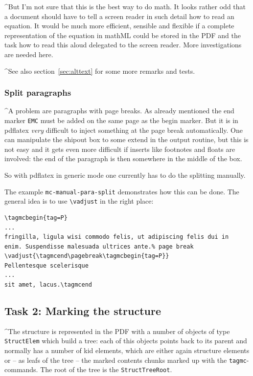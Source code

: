 \documentclass[DIV=12,parskip=half-,bibliography=totoc]{scrartcl}
\newcommand\PDF{PDF}
\begin{document}
\TagP^But I'm not sure that this is the best way to do math. It looks rather odd that a document should have to tell a screen reader in such detail how to read an equation. It would be much more efficient, sensible and flexible if a complete representation of the equation in mathML could be stored in the \PDF{} and the task how to read this aloud delegated to the screen reader. More investigations are needed here.\TagPend

\TagP^See also section~\ref{sec:alttext} for some more remarks and tests.\TagPend

\subsubsection{Split paragraphs}\label{sec:splitpara}

\TagP^A problem are paragraphs with page breaks.  As already mentioned the end marker \texttt{EMC} must be added on the same page as the begin marker. But it is in pdflatex \emph{very} difficult to inject something at the page break automatically. One can manipulate the shipout box to some extend in the output routine, but this is not easy and it gets even more difficult if inserts like footnotes and floats are involved: the end of the paragraph is then somewhere in the middle of the box.

\TagP So with pdflatex in generic mode one currently has to do the splitting manually.

\TagP The example \texttt{mc-manual-para-split} demonstrates how this can be done. The general idea is to use \verb+\vadjust+ in the right place:\TagPend

\begin{lstlisting}
\tagmcbegin{tag=P}
...
fringilla, ligula wisi commodo felis, ut adipiscing felis dui in
enim. Suspendisse malesuada ultrices ante.% page break
\vadjust{\tagmcend\pagebreak\tagmcbegin{tag=P}}
Pellentesque scelerisque
...
sit amet, lacus.\tagmcend
\end{lstlisting}
\tagmcend\tagstructend



\subsection{Task 2: Marking the structure}
\TagP^The structure is represented in the \PDF{} with a number of objects of type \texttt{StructElem} which build a tree: each of this objects points back to its parent and normally has a number of kid elements, which are either again structure elements or -- as leafs of the tree -- the marked contents chunks marked up with the \verb+tagmc+-commands. The root of the tree is the \texttt{StructTreeRoot}.\TagPend
\end{document}

